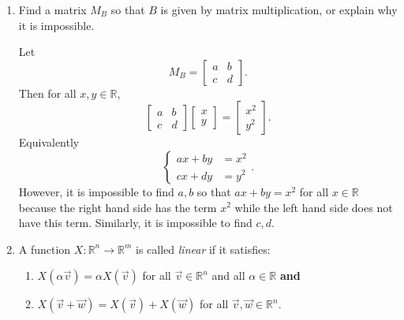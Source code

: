 \documentclass[letter]{article}
\newcommand{\R}{\mathbb{R}}
\newcommand{\mat}[1]{\begin{bmatrix}#1\end{bmatrix}}
\newenvironment{answer}{
	\begin{adjustwidth}{8mm}{} \vspace{2mm}}{\end{adjustwidth} \vspace{2mm}
}
\theoremstyle{plain}
\theoremstyle{definition}
\theoremstyle{remark}
\begin{document}
\begin{enumerate}
\begin{enumerate}
\begin{answer}
\[\begin{array}{cc}
					1 & 1
					\end{array}\right].
					\]
				\end{answer}
				\item Find a matrix $M_B$ so that $B$ is given by matrix
					multiplication, or explain why it is impossible.
				\begin{answer}
					Let
					\[
					M_B = \left[\begin{array}{cc}
					a & b \\
					c & d
					\end{array}\right].
					\]
					Then for all $x, y \in \R$,
					\[
					\left[\begin{array}{cc}
					a & b \\
					c & d
					\end{array}\right]
					\mat{x\\y} = \mat{x^2\\y^2}. 
					\]
					Equivalently
					\[
					\begin{cases}
					ax+by &= x^2\\
					cx+dy &= y^2
					\end{cases}.
					\]
					However, it is impossible to find $a,b$ so that $ax+by = x^2$ for all $x \in \R$ because the right hand side has the term $x^2$ while the left hand side does not have this term. Similarly, it is impossible to find $c,d$. 
				\end{answer}
				\item A function $X:\R^n\to\R^m$ is called \emph{linear} if it satisfies:
					\begin{enumerate}
						\item $X(\alpha \vec v) = \alpha X(\vec v)$ for all $\vec v\in \R^n$
					and all $\alpha\in \R$ {\bf and} 
						\item $X(\vec v+\vec w) = X(\vec v)
					+X(\vec w)$ for all $\vec v, \vec w\in \R^n$.
					\end{enumerate}


\end{enumerate}
\end{enumerate}
\end{document}
